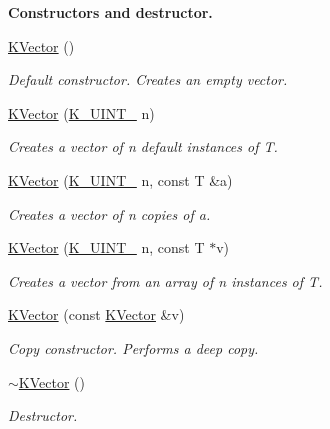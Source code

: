 \begin{Indent}\textbf{ Constructors and destructor.}\par
\begin{DoxyCompactItemize}
\item 
\mbox{\label{classKalman_1_1KVector_a53bf733f778c869cd39d972dc6eb4b0f}} 
\mbox{\hyperlink{classKalman_1_1KVector_a53bf733f778c869cd39d972dc6eb4b0f}{K\+Vector}} ()
\begin{DoxyCompactList}\small\item\em Default constructor. Creates an empty vector. \end{DoxyCompactList}\item 
\mbox{\hyperlink{classKalman_1_1KVector_a0c66fd0a1eb83f5ff0c08ffd7d1c8206}{K\+Vector}} (\mbox{\hyperlink{namespaceKalman_a628a50cae10f6e2035393d4f96c698bd}{K\+\_\+\+U\+I\+N\+T\+\_}} n)
\begin{DoxyCompactList}\small\item\em Creates a vector of {\ttfamily n} default instances of {\ttfamily T}. \end{DoxyCompactList}\item 
\mbox{\hyperlink{classKalman_1_1KVector_aaeec01812b3f0747f5b623a952ea2fbb}{K\+Vector}} (\mbox{\hyperlink{namespaceKalman_a628a50cae10f6e2035393d4f96c698bd}{K\+\_\+\+U\+I\+N\+T\+\_}} n, const T \&a)
\begin{DoxyCompactList}\small\item\em Creates a vector of {\ttfamily n} copies of {\ttfamily a}. \end{DoxyCompactList}\item 
\mbox{\hyperlink{classKalman_1_1KVector_a7b42e18da011d77bc603a80c27d2fcb2}{K\+Vector}} (\mbox{\hyperlink{namespaceKalman_a628a50cae10f6e2035393d4f96c698bd}{K\+\_\+\+U\+I\+N\+T\+\_}} n, const T $\ast$v)
\begin{DoxyCompactList}\small\item\em Creates a vector from an array of {\ttfamily n} instances of {\ttfamily T}. \end{DoxyCompactList}\item 
\mbox{\hyperlink{classKalman_1_1KVector_abbb914df857bcab254f9190986464d3c}{K\+Vector}} (const \mbox{\hyperlink{classKalman_1_1KVector}{K\+Vector}} \&v)
\begin{DoxyCompactList}\small\item\em Copy constructor. Performs a deep copy. \end{DoxyCompactList}\item 
\mbox{\label{classKalman_1_1KVector_a92c667218e7b8472ec0b77dcab24e356}} 
\mbox{\hyperlink{classKalman_1_1KVector_a92c667218e7b8472ec0b77dcab24e356}{$\sim$\+K\+Vector}} ()
\begin{DoxyCompactList}\small\item\em Destructor. \end{DoxyCompactList}\end{DoxyCompactItemize}
\end{Indent}
